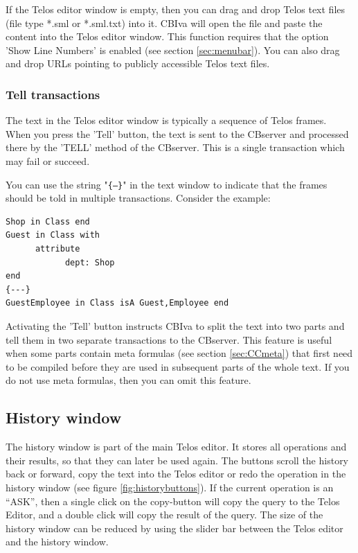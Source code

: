 If the Telos editor window is empty, then you can drag and drop Telos text files (file
type *.sml or *.sml.txt) into it. CBIva will open the file and paste the content into the Telos
editor window. This function requires that the option 'Show Line Numbers' is enabled
(see section \ref{sec:menubar}). You can also drag and drop URLs pointing to publicly accessible
Telos text files.

\subsubsection{Tell transactions}
The text in the Telos editor window is typically a sequence of Telos frames. When
you press the 'Tell' button, the text is sent to the CBserver and processed there by
the 'TELL' method of the CBserver. This is a single transaction which may fail or succeed.

You can use the string "{\tt \{---\}}" in the text window to indicate that the
frames should be told in multiple transactions. Consider the example:

{\small
\begin{verbatim}
Shop in Class end
Guest in Class with
      attribute
            dept: Shop
end
{---}
GuestEmployee in Class isA Guest,Employee end
\end{verbatim}
}


Activating the 'Tell' button instructs CBIva to split the text into two parts and tell them in two
separate transactions to the CBserver. This feature is useful when some parts contain meta formulas
(see section \ref{sec:CCmeta})
that first need to be compiled before they are used in subsequent parts of the whole text.
If you do not use meta formulas, then you can omit this feature.


\subsection{History window}
\label{sec:history_window}

The history window is part of the main Telos editor. It stores all operations and their
results, so that they can later be used again. The buttons scroll the history back or forward,
copy the text into the Telos editor or redo the operation in the history window (see figure \ref{fig:historybuttons}).
If the current operation is an ``ASK'', then a single click on the copy-button will copy the
query to the Telos Editor, and a double click will copy the result of the query.
The size of the history window can be reduced by using the slider bar between the
Telos editor and the history window.


